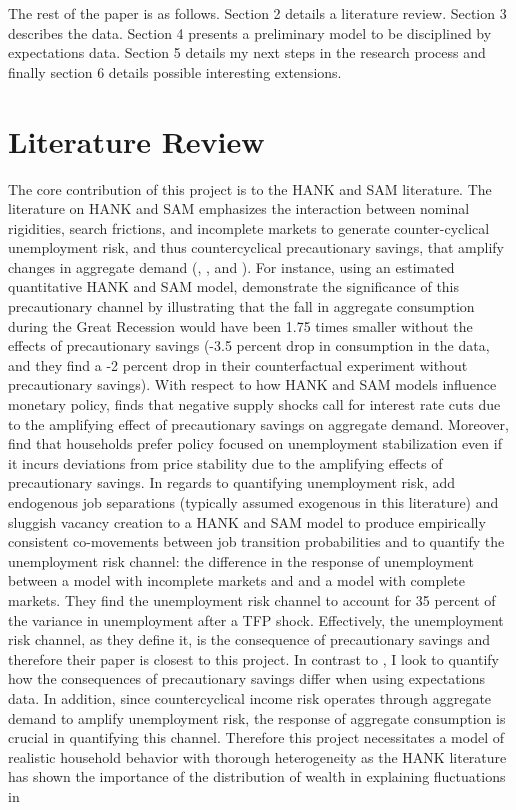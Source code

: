 \documentclass[titlepage]{\econtex}\providecommand{\texname}{Dissertation-Proposal}
\begin{document}
The rest of the paper is as follows. Section 2 details a literature review. Section 3 describes the data. Section 4 presents a preliminary model to be disciplined by expectations data. Section 5 details my next steps in the research process and finally section 6 details possible interesting extensions. 




\hypertarget{Literature Review}{}
\section{Literature Review}


The core contribution of this project is to the HANK and SAM literature. The literature on HANK and SAM emphasizes the interaction between nominal rigidities, search frictions, and incomplete markets to generate counter-cyclical unemployment risk, and thus countercyclical precautionary savings, that amplify changes in aggregate demand  (\cite{den2018unemployment}, \cite{leduc2016uncertainty}, and \cite{ravn2017job}). For instance, using an estimated quantitative HANK and SAM model, \cite{challe2017precautionary} demonstrate the significance of this precautionary channel by illustrating that the fall in aggregate consumption during the Great Recession would have been 1.75 times smaller without the effects of precautionary savings (-3.5 percent drop in consumption in the data, and they find a -2 percent drop in their counterfactual experiment without precautionary savings). With respect to how HANK and SAM models influence monetary policy, \cite{challe2020uninsured} finds that negative supply shocks call for interest rate cuts due to the amplifying effect of precautionary savings on aggregate demand.  Moreover, \cite{gornemann2016doves} find that households prefer policy focused on unemployment stabilization even if it incurs deviations from price stability due to the amplifying effects of precautionary savings. In regards to quantifying unemployment risk, \cite{broer2021unemployment} add endogenous job separations (typically assumed exogenous in this literature) and sluggish vacancy creation to a HANK and SAM model to produce empirically consistent co-movements between job transition probabilities and to quantify the unemployment risk channel: the difference in the response of unemployment between a model with incomplete markets and and a model with complete markets. They find the unemployment risk channel to account for 35 percent of the variance in unemployment after a TFP shock. Effectively, the unemployment risk channel, as they define it, is the consequence of precautionary savings and therefore their paper is closest to this project. In contrast to \cite{broer2021unemployment}, I look to quantify how the consequences of precautionary savings differ when using expectations data. In addition, since countercyclical income risk operates through aggregate demand to amplify unemployment risk, the response of aggregate consumption is crucial in quantifying this channel. Therefore this project necessitates a model of realistic household behavior with thorough heterogeneity as the HANK literature has shown the importance of the distribution of wealth in explaining fluctuations in 
\end{document}
